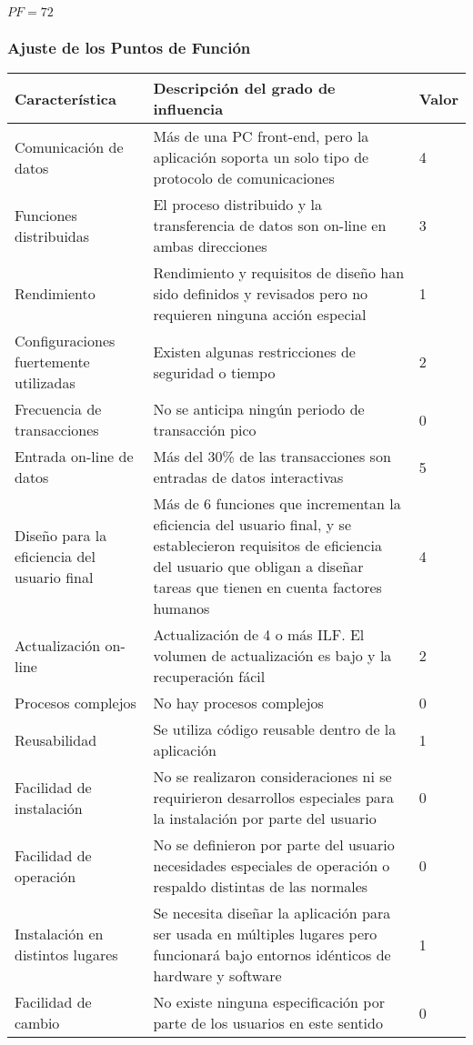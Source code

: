     $PF = 72$
    
    \subsubsection{Ajuste de los Puntos de Función}
        
   \begin{table}[H]
   \centering
    \begin{tabular}{|p{4cm}|p{10cm}|l|}
        \hline
        Característica & Descripción del grado de influencia & Valor \\ \hline
        Comunicación de datos & Más de una PC front-end, pero la aplicación soporta un solo tipo de protocolo de comunicaciones & 4 \\ \hline
        Funciones distribuidas & El proceso distribuido y la transferencia de datos son on-line en ambas direcciones & 3 \\ \hline
        Rendimiento & Rendimiento y requisitos de diseño han sido definidos y revisados pero no requieren ninguna acción especial & 1 \\ \hline
        Configuraciones fuertemente utilizadas & Existen algunas restricciones de seguridad o tiempo & 2 \\ \hline
        Frecuencia de transacciones & No se anticipa ningún periodo de transacción pico & 0 \\ \hline
        Entrada on-line de datos & Más del 30\% de las transacciones son entradas de datos interactivas & 5 \\ \hline
        Diseño para la eficiencia del usuario final & Más de 6 funciones que incrementan la eficiencia del usuario final, y se establecieron requisitos de eficiencia del usuario que obligan a diseñar tareas que tienen en cuenta factores humanos & 4 \\ \hline
        Actualización on-line & Actualización de 4 o más ILF. El volumen de actualización es bajo y la recuperación fácil & 2 \\ \hline
        Procesos complejos & No hay procesos complejos & 0 \\ \hline
        Reusabilidad & Se utiliza código reusable dentro de la aplicación & 1 \\ \hline
        Facilidad de instalación & No se realizaron consideraciones ni se requirieron desarrollos especiales para la instalación por parte del usuario & 0 \\ \hline
        Facilidad de operación & No se definieron por parte del usuario necesidades especiales de operación o respaldo distintas de las normales & 0 \\ \hline
        Instalación en distintos lugares & Se necesita diseñar la aplicación para ser usada en múltiples lugares pero funcionará bajo entornos idénticos de hardware y software & 1 \\ \hline
        Facilidad de cambio & No existe ninguna especificación por parte de los usuarios en este sentido & 0 \\
        \hline
    \end{tabular}
\end{table}

